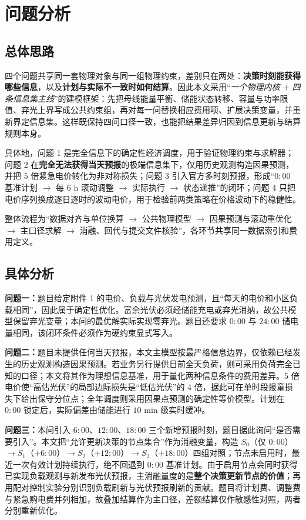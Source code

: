 \section{问题分析}

\subsection{总体思路}

四个问题共享同一套物理对象与同一组物理约束，差别只在两处：\textbf{决策时刻能获得哪些信息}，以及\textbf{计划与实际不一致时如何结算}。因此本文采用“\emph{一个物理内核 $+$ 四条信息集主线}”的建模框架：先把母线能量平衡、储能状态转移、容量与功率限值、弃光上界写成公共约束组，再对每一问替换相应费用项、扩展决策变量，并重新界定信息集。这样既保持四问口径一致，也能把结果差异归因到信息更新与结算规则本身。

具体地，问题 1 是完全信息下的确定性经济调度，用于验证物理约束与求解器；问题 2 在\textbf{完全无法获得当天预报}的极端信息集下，仅用历史观测构造因果预测，并把 $5$ 倍紧急电价转化为非对称损失；问题 3 引入官方多时刻预报，形成“$0{:}00$ 基准计划 $\rightarrow$ 每 $6$ h 滚动调整 $\rightarrow$ 实际执行 $\rightarrow$ 状态递推”的闭环；问题 4 只把电价序列换成逐日逐时的波动电价，用于检验前两类策略在价格波动下的稳健性。

整体流程为“数据对齐与单位换算 $\rightarrow$ 公共物理模型 $\rightarrow$ 因果预测与滚动重优化 $\rightarrow$ 主口径求解 $\rightarrow$ 消融、回代与提交文件核验”，各环节共享同一数据索引和费用定义。

\subsection{具体分析}

\indent\textbf{问题一：}题目给定附件 1 的电价、负载与光伏发电预测，且“每天的电价和小区负载相同”，因此属于确定性优化。富余光伏必须经储能充电或弃光消纳，故公共模型保留弃光变量；本问的最优解实际实现零弃光。题目还要求 $0{:}00$ 与 $24{:}00$ 储电量相同，该闭环条件必须作为硬约束显式写入。

\indent\textbf{问题二：}题目未提供任何当天预报，本文主模型按最严格信息边界，仅依赖已经发生的历史观测构造因果预测。若业务另行提供日前全天负荷，则可采用负荷完全已知的口径；本文将其作为理想信息基准，用于量化两种信息条件的费用差异。$5$ 倍电价使“高估光伏”的局部边际损失是“低估光伏”的 $4$ 倍，据此可在单时段报童损失下给出保守分位点；全年调度则采用因果点预测的确定性等价模型。计划在 $0{:}00$ 锁定后，实际偏差由储能进行 $10$ min 级实时缓冲。

\indent\textbf{问题三：}本问引入 $6{:}00$、$12{:}00$、$18{:}00$ 三个新增预报时刻，题目据此询问“是否需要引入”。本文把“允许更新决策的节点集合”作为消融变量，构造 $S_0$（仅 $0{:}00$）$\to S_1$（$+6{:}00$）$\to S_2$（$+12{:}00$）$\to S_3$（$+18{:}00$）四组对照；节点未启用时，最近一次有效计划持续执行，绝不回退到 $0{:}00$ 基准计划。由于启用节点会同时获得已实现负载观测与新发布光伏预报，主消融量度的是\textbf{整个决策更新节点的价值}；再用配对控制实验分别识别负载刷新与光伏预报刷新的贡献。题目将计划费、调整费与紧急购电费并列相加，故叠加结算作为主口径，差额结算仅作敏感性对照，两者分别重新优化。

